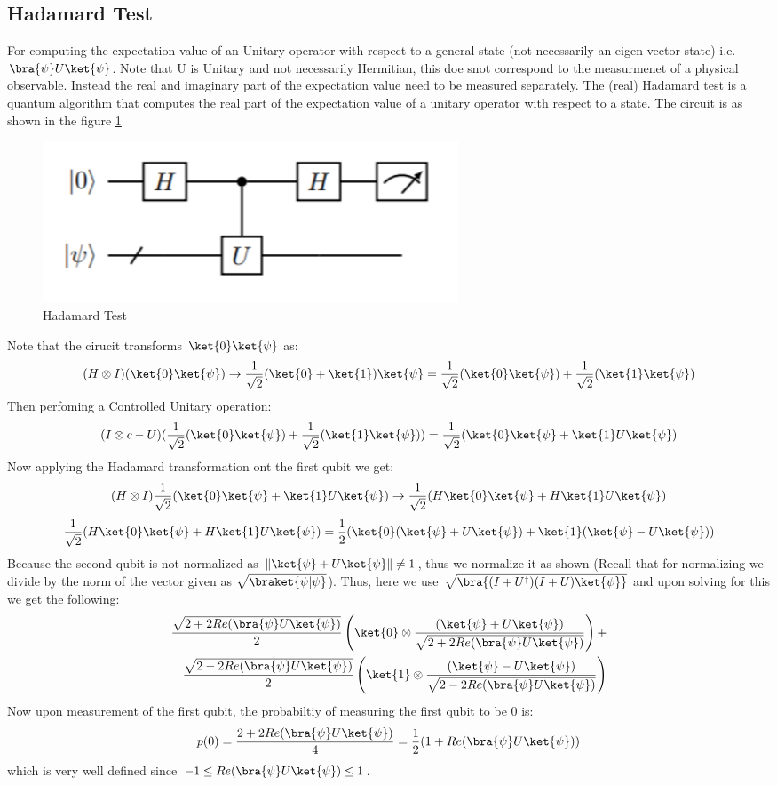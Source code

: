 \documentclass[12pt, oneside]{book}
\theoremstyle{definition}
\theoremstyle{definition}
\theoremstyle{remark}
\begin{document}
\subsection{Hadamard Test}
For computing the expectation value of an Unitary operator with respect to a general state (not necessarily an eigen vector state) i.e. $\bra{\psi}U\ket{\psi}$.
Note that U is Unitary and not necessarily Hermitian, this doe snot correspond to the measurmenet of a physical observable.
Instead the real and imaginary part of the expectation value need to be measured separately.
The (real) Hadamard test is a quantum algorithm that computes the real part of the expectation value of a unitary operator with respect to a state.
The circuit is as shown in the figure \ref{Hadamardtest}
\begin{figure}[H]
    \centering
    \includegraphics[width=0.6\textwidth]{../images/hadamardtest.png}
    \caption{Hadamard Test}
    \label{Hadamardtest}
\end{figure}
Note that the cirucit transforms $\ket{0}\ket{\psi}$ as:
\[
(H\otimes I)(\ket{0}\ket{\psi})\rightarrow \frac{1}{\sqrt{2}}(\ket{0}+\ket{1})\ket{\psi}=\frac{1}{\sqrt{2}}(\ket{0}\ket{\psi}) +\frac{1}{\sqrt{2}}(\ket{1}\ket{\psi})
\]
Then perfoming a Controlled Unitary operation:
\[
(I\otimes c-U)(\frac{1}{\sqrt{2}}(\ket{0}\ket{\psi}) +\frac{1}{\sqrt{2}}(\ket{1}\ket{\psi}))=\frac{1}{\sqrt{2}}(\ket{0}\ket{\psi}+\ket{1}U\ket{\psi})
\]
Now applying the Hadamard transformation ont the first qubit we get:
\[
(H\otimes I)\frac{1}{\sqrt{2}}(\ket{0}\ket{\psi}+\ket{1}U\ket{\psi})\rightarrow \frac{1}{\sqrt{2}}(H\ket{0}\ket{\psi}+H\ket{1}U\ket{\psi})
\]
\[
    \frac{1}{\sqrt{2}}(H\ket{0}\ket{\psi}+H\ket{1}U\ket{\psi})=\frac{1}{2}(\ket{0}(\ket{\psi}+U\ket{\psi})+\ket{1}(\ket{\psi}-U\ket{\psi}))
\]
Because the second qubit is not normalized as $\|\ket{\psi}+U\ket{\psi}\|\neq 1$, thus we normalize it as shown (Recall that for normalizing we divide by the norm of the vector given as $\sqrt{\braket{\psi|\psi}}$). Thus,
here we use $\sqrt{\bra{(I+U^{\dagger})(I+U)\ket{\psi}}}$ and upon solving for this we get the following: 
\begin{align*}
\frac{\sqrt{2+2Re(\bra{\psi}U\ket{\psi})}}{2}\left(\ket{0}\otimes \frac{(\ket{\psi}+U\ket{\psi})}{\sqrt{2+2Re(\bra{\psi}U\ket{\psi})}}\right)+&\\
\frac{\sqrt{2-2Re(\bra{\psi}U\ket{\psi})}}{2}\left(\ket{1}\otimes \frac{(\ket{\psi}-U\ket{\psi})}{\sqrt{2-2Re(\bra{\psi}U\ket{\psi})}}\right)
\end{align*}
Now upon measurement of the first qubit, the probabiltiy of measuring the first qubit to be 0 is:
\[
p(0)=\frac{2+2Re(\bra{\psi}U\ket{\psi})}{4}=\frac{1}{2}(1+Re(\bra{\psi}U\ket{\psi}))
\]
which is very well defined since $-1\leq Re(\bra{\psi}U\ket{\psi})\leq 1$.
\end{document}
